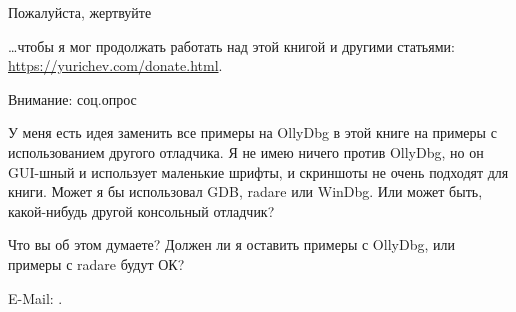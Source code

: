 \vspace*{\fill}

\huge Пожалуйста, жертвуйте
\normalsize

\bigskip
\bigskip
\bigskip

\dots чтобы я мог продолжать работать над этой книгой и другими статьями: \\
\url{https://yurichev.com/donate.html}.

\bigskip
\bigskip
\bigskip

\huge Внимание: соц.опрос
\normalsize

\bigskip
\bigskip
\bigskip

У меня есть идея заменить все примеры на OllyDbg в этой книге на примеры с использованием другого отладчика.
Я не имею ничего против OllyDbg, но он GUI-шный и использует маленькие шрифты, и скриншоты не очень подходят для книги.
Может я бы использовал GDB, radare или WinDbg.
Или может быть, какой-нибудь другой консольный отладчик?

Что вы об этом думаете?
Должен ли я оставить примеры с OllyDbg, или примеры с radare будут ОК?

E-Mail: \GTT{\EMAIL}.

\vspace*{\fill}
\vfill
